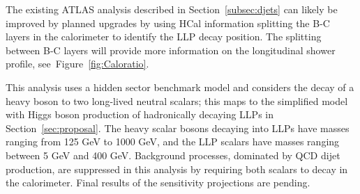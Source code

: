 The existing ATLAS analysis described in Section~\ref{subsec:djets} can likely be improved by planned upgrades by using HCal information splitting the B-C layers in the calorimeter to identify the LLP decay position. 
The splitting between B-C layers will provide more information on the longitudinal shower profile, see~Figure~\ref{fig:Caloratio}.

This analysis uses a hidden sector benchmark model and considers the decay of a heavy boson to two long-lived neutral scalars; this maps to the simplified model with Higgs boson production of hadronically decaying LLPs in Section~\ref{sec:proposal}. The heavy scalar bosons decaying into LLPs have masses ranging from 125 GeV to 1000 GeV, and the LLP scalars have masses ranging between 5 GeV and 400 GeV.
Background processes, dominated by QCD dijet production, are suppressed in this analysis by requiring both scalars to decay  in the calorimeter. Final results of the sensitivity projections are pending.

